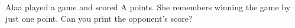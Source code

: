 
Alaa played a game and scored A points. She remembers winning the game by just one point. Can you print the opponent's score?